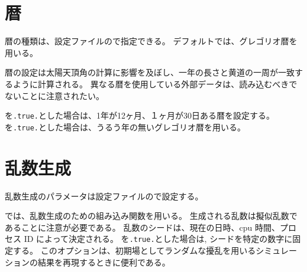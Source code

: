 \section{暦} \label{subsec:calendar}

暦の種類は、設定ファイルので指定できる。
デフォルトでは、グレゴリオ暦を用いる。


\noindent
暦の設定は太陽天頂角の計算に影響を及ぼし、一年の長さと黄道の一周が一致するように計算される。
異なる暦を使用している外部データは、読み込むべきでないことに注意されたい。

を\verb|.true.|とした場合は、1年が12ヶ月、１ヶ月が30日ある暦を設定する。
を\verb|.true.|とした場合は、うるう年の無いグレゴリオ暦を用いる。


\section{乱数生成} \label{subsec:random}

乱数生成のパラメータは設定ファイルので設定する。


\noindent
\scalelib では、乱数生成のための組み込み関数を用いる。
生成される乱数は擬似乱数であることに注意が必要である。
乱数のシードは、現在の日時、cpu 時間、プロセス ID によって決定される。
%
を\verb|.true.|とした場合は, シードを特定の数字に固定する。
このオプションは、初期場としてランダムな擾乱を用いるシミュレーションの結果を再現するときに便利である。


